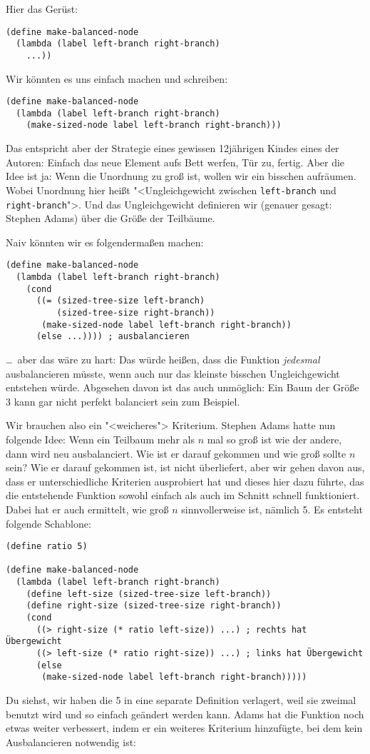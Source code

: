 %
Hier das Gerüst:
%
\begin{lstlisting}
(define make-balanced-node
  (lambda (label left-branch right-branch)
    ...))
\end{lstlisting}
%
Wir könnten es uns einfach machen und schreiben:
%
\begin{lstlisting}
(define make-balanced-node
  (lambda (label left-branch right-branch)
    (make-sized-node label left-branch right-branch)))
\end{lstlisting}
%
Das entspricht aber der Strategie eines gewissen 12jährigen Kindes
eines der Autoren: Einfach das neue Element aufs Bett werfen, Tür zu,
fertig.  Aber die Idee ist ja: Wenn die Unordnung zu groß ist, wollen
wir ein bisschen aufräumen.  Wobei Unordnung hier heißt
"<Ungleichgewicht zwischen \lstinline{left-branch} und
\lstinline{right-branch}">.  Und das Ungleichgewicht definieren wir
(genauer gesagt: Stephen Adams) über die Größe der Teilbäume.

Naiv könnten wir es folgendermaßen machen:
%
\begin{lstlisting}
(define make-balanced-node
  (lambda (label left-branch right-branch)
    (cond
      ((= (sized-tree-size left-branch)
          (sized-tree-size right-branch))
       (make-sized-node label left-branch right-branch))
      (else ...)))) ; ausbalancieren
\end{lstlisting}
%
\ldots~aber das wäre zu hart: Das würde heißen, dass die Funktion
\emph{jedesmal} ausbalancieren müsste, wenn auch nur das kleinste
bisschen Ungleichgewicht entstehen würde.  Abgesehen davon ist das
auch unmöglich: Ein Baum der Größe 3 kann gar nicht perfekt balanciert
sein zum Beispiel.

Wir brauchen also ein "<weicheres"> Kriterium.  Stephen Adams hatte
nun folgende Idee: Wenn ein Teilbaum mehr als $n$ mal so groß ist wie
der andere, dann wird neu ausbalanciert.  Wie ist er darauf gekommen
und wie groß sollte $n$ sein?  Wie er darauf gekommen ist, ist
nicht überliefert, aber wir gehen davon aus, dass er unterschiedliche
Kriterien ausprobiert hat und dieses hier dazu führte, das die
entstehende Funktion sowohl einfach als auch im Schnitt schnell
funktioniert.  Dabei hat er auch ermittelt, wie groß $n$
sinnvollerweise ist, nämlich 5.  Es entsteht folgende Schablone:
%
\begin{lstlisting}
(define ratio 5)

(define make-balanced-node
  (lambda (label left-branch right-branch)
    (define left-size (sized-tree-size left-branch))
    (define right-size (sized-tree-size right-branch))
    (cond
      ((> right-size (* ratio left-size)) ...) ; rechts hat Übergewicht
      ((> left-size (* ratio right-size)) ...) ; links hat Übergewicht
      (else
       (make-sized-node label left-branch right-branch)))))
\end{lstlisting}
%
Du siehst, wir haben die 5 in eine separate Definition verlagert, weil
sie zweimal benutzt wird und so einfach geändert werden kann.  Adams
hat die Funktion noch etwas weiter verbessert, indem er ein weiteres
Kriterium hinzufügte, bei dem kein Ausbalancieren notwendig ist:

